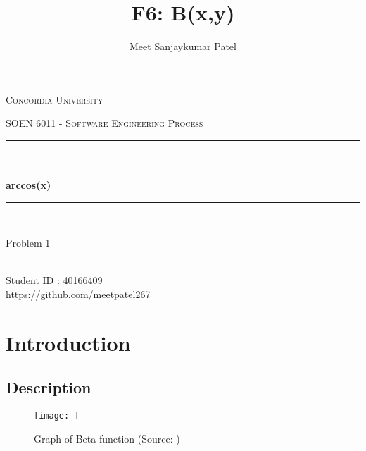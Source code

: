 \documentclass[12pt]{report}
\title{F6: B(x,y)}
\author{Meet Sanjaykumar Patel}
\date{}
\makeatletter
\let\thetitle\@title
\let\theauthor\@author
\makeatother
\begin{document}
\begin{titlepage}
	\centering
    \vspace*{0.5 cm}
\begin{center}    \textsc{\Large Concordia University}\\[2.0 cm]	\end{center}
	\textsc{\Large  SOEN 6011 - Software Engineering Process }\\[0.5 cm]
	\rule{\linewidth}{0.2 mm} \\[0.4 cm]
	{ \huge \textbf \thetitle}\\[0.2 cm]
	{ \huge \textbf{arccos(x)}}
	\rule{\linewidth}{0.2 mm} \\[1.5 cm]

\begin{center}   {\Large Problem 1}\\[2.0 cm]
\end{center}	
\begin{center}   {\Large \textbf{\theauthor}} \\[0.2 cm]
                 {\large Student ID : 40166409 }\\[0.2 cm]
                 {\large https://github.com/meetpatel267}
\end{center}
	
\end{titlepage}

\tableofcontents
\pagebreak

\renewcommand{\thesection}{\arabic{section}}
\section{Introduction}
\subsection{Description}


\begin{figure}[h!]
\begin{center}
  \texttt{[image: ]}
  \end{center}
  \caption{Graph of Beta function (Source: )}
\end{figure}







\end{document}
